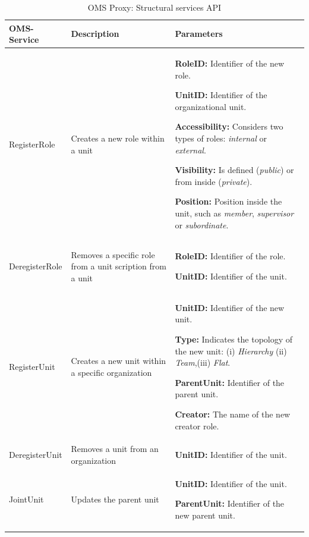 \begin{table}[h!t]
\begin{tabular}{|l|p{5cm}|p{5cm}|}
\hline
OMS-Service & Description & Parameters \\ \hline
RegisterRole & Creates a new role within a unit &


\textbf{RoleID: } Identifier of the new role.

\textbf{UnitID:} Identifier of the organizational unit.

\textbf{Accessibility:} Considers two types of roles: \textit{internal} or \textit{external}.

\textbf{Visibility:} Is defined (\textit{public}) or from inside (\textit{private}).

\textbf{Position:} Position inside the unit, such as \textit{member}, \textit{supervisor} or \textit{subordinate}.

\\  \hline

DeregisterRole & Removes a specific role from a unit
scription from a unit
&
\textbf{RoleID:} Identifier of the role.

\textbf{UnitID:} Identifier of the unit.

\\  \hline

RegisterUnit & Creates a new unit within a specific organization
 &

\textbf{UnitID:} Identifier of the new unit.

\textbf{Type:} Indicates the topology of the new unit: (i) \textit{Hierarchy} (ii) \textit{Team},(iii)\textit{ Flat}.

\textbf{ParentUnit:} Identifier of the parent unit.

\textbf{Creator:} The name of the new creator role.

\\  \hline

DeregisterUnit & Removes a unit from an organization
 &
\textbf{UnitID:} Identifier of the unit.

\\  \hline

JointUnit & Updates the parent unit
 &
\textbf{UnitID:} Identifier of the unit.

\textbf{ParentUnit:} Identifier of the new parent unit.

\\  \hline
\end{tabular}
\caption{OMS Proxy: Structural services API}
\label{tab:thomas_OMSProxy_registration}
\end{table}



